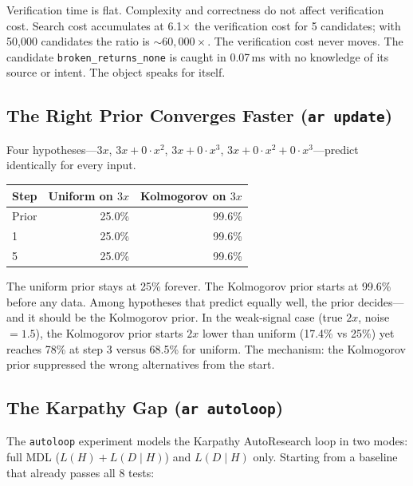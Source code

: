 Verification time is flat. Complexity and correctness do not affect
verification cost. Search cost accumulates at 6.1$\times$ the
verification cost for 5 candidates; with 50,000 candidates the ratio
is ${\sim}60{,}000\times$. The verification cost never moves. The
candidate \texttt{broken\_returns\_none} is caught in 0.07\,ms with
no knowledge of its source or intent. The object speaks for itself.

\subsection{The Right Prior Converges Faster (\texttt{ar update})}

Four hypotheses---$3x$, $3x + 0{\cdot}x^2$, $3x + 0{\cdot}x^3$,
$3x + 0{\cdot}x^2 + 0{\cdot}x^3$---predict identically for every
input.

\begin{center}
\begin{tabular}{lrr}
\toprule
Step & Uniform on $3x$ & Kolmogorov on $3x$ \\
\midrule
Prior & 25.0\% & 99.6\% \\
1     & 25.0\% & 99.6\% \\
5     & 25.0\% & 99.6\% \\
\bottomrule
\end{tabular}
\end{center}

The uniform prior stays at 25\% forever. The Kolmogorov prior starts
at 99.6\% before any data. Among hypotheses that predict equally well,
the prior decides---and it should be the Kolmogorov prior. In the
weak-signal case (true $2x$, noise $= 1.5$), the Kolmogorov prior
starts $2x$ lower than uniform (17.4\% vs 25\%) yet reaches 78\% at
step 3 versus 68.5\% for uniform. The mechanism: the Kolmogorov prior
suppressed the wrong alternatives from the start.

\subsection{The Karpathy Gap (\texttt{ar autoloop})}

The \texttt{autoloop} experiment models the Karpathy AutoResearch loop
in two modes: full MDL ($L(H) + L(D \mid H)$) and $L(D \mid H)$ only.
Starting from a baseline that already passes all 8 tests:

